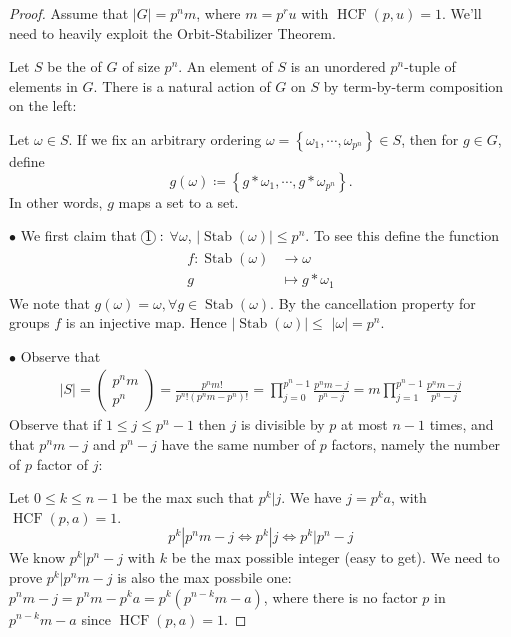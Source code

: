 \documentclass{article}
\newcommand*\circled[1]{\tikz[baseline=(char.base)]{
    \node[shape=circle, draw, inner sep=0.1pt, 
        minimum height=5pt] (char) {\vphantom{1g}#1};}}
\newcommand{\Stab}{\operatorname{Stab}}
\newcommand{\HCF}{\operatorname{HCF}}
\begin{document}
\begin{proof}
Assume that $|G|=p^{n} m$, where $m=p^{r} u$ with $\HCF(p, u)=1 .$  We'll need to heavily exploit the Orbit-Stabilizer Theorem.

Let $S$ be the  of $G$ of size $p^{n}$. An element of $S$ is an unordered $p^n$-tuple of  elements in $G$. There is a natural action of $G$ on $S$ by term-by-term composition on the left:

Let $\omega \in S$. If we fix an arbitrary ordering $\omega=\left\{\omega_{1}, \cdots, \omega_{p^{n}}\right\} \in S$, then for $g\in G$, define $$g(\omega)\coloneqq\left\{g * \omega_{1}, \cdots, g * \omega_{p^{n}}\right\}.$$
In other words, $g$ maps a set to a set.

$\bullet$ We first claim that $\circled{1}:$ $\forall \omega$, $|\Stab(\omega)| \leq p^{n}$. To see this define the function
\begin{align*}
\begin{aligned}
f: \operatorname{Stab}(\omega) & \rightarrow \omega \\
g & \mapsto g * \omega_{1}
\end{aligned}
\end{align*}
We note that $g(\omega)=\omega, \forall g\in\Stab(\omega)$. By the cancellation property for groups $f$ is an injective map. Hence $|\operatorname{Stab}(\omega)| \leq$ $|\omega|=p^{n}$.

$\bullet$ Observe that
\begin{align*}
|S|=\left(\begin{array}{c}
p^{n} m \\
p^{n}
\end{array}\right)=\frac{p^{n} m !}{p^{n} !\left(p^{n} m-p^{n}\right) !}=\prod_{j=0}^{p^{n}-1} \frac{p^{n} m-j}{p^{n}-j}=m \prod_{j=1}^{p^{n}-1} \frac{p^{n} m-j}{p^{n}-j}
\end{align*}
Observe that if $1 \leq j \leq p^{n}-1$ then $j$ is divisible by $p$ at most $n-1$ times, and  that $p^{n} m-j$ and $p^{n}-j$ have the same number of $p$ factors, namely the number of $p$ factor of $j$:

Let $0\le k\le n-1$ be the max such that $p^k|j$. We have $j=p^ka$, with $\HCF(p,a)=1$.
$$p^k|p^nm-j\Leftrightarrow p^k|j\Leftrightarrow p^k|p^n-j$$
We know $p^k|p^n-j$ with $k$ be the max possible integer (easy to get). We need to prove $p^k|p^nm-j$ is also the max possbile one: $p^nm-j=p^nm-p^ka=p^k(p^{n-k}m-a)$, where there is no factor $p$ in $p^{n-k}m-a$ since $\HCF(p,a)=1$.



\end{proof}
\end{document}
